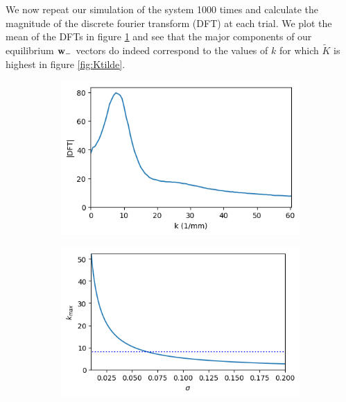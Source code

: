\documentclass{article}
\begin{document}
We now repeat our simulation of the system 1000 times and calculate the magnitude of the discrete fourier transform (DFT) at each trial. We plot the mean of the DFTs in figure \ref{fig:DFT} and see that the major components of our equilibrium ${\bf w}_-$ vectors do indeed correspond to the values of $k$ for which $\tilde K$ is highest in figure \ref{fig:Ktilde}. 

\begin{figure}[h]
	\centering
	\begin{subfigure}[t]{0.35\linewidth}
		\centering
		\includegraphics[width = 1.0\linewidth, trim={5 5 7 9}, clip=true]{figures/plot_DFT.png}
		\label{fig:DFT}	
	\end{subfigure}%
	\hspace{0.1\linewidth}
	\begin{subfigure}[t]{0.35\linewidth}
		\centering
		\includegraphics[width = 1.0\linewidth, trim={5 5 7 9}, clip=true]{figures/test_maxk.png}
		\label{fig:maxk}	
	\end{subfigure}%
\caption{}
\label{}
\end{figure}
\end{document}
